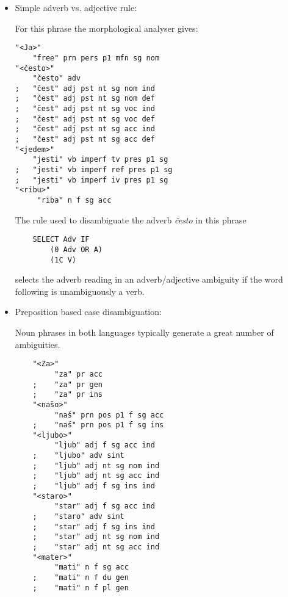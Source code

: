 \begin{itemize}

\item Simple adverb vs. adjective rule:


For this phrase the morphological analyser gives:

{\small
\begin{Verbatim}
"<Ja>"
    "free" prn pers p1 mfn sg nom 
"<često>"
    "često" adv
;   "čest" adj pst nt sg nom ind
;   "čest" adj pst nt sg nom def
;   "čest" adj pst nt sg voc ind
;   "čest" adj pst nt sg voc def
;   "čest" adj pst nt sg acc ind
;   "čest" adj pst nt sg acc def
"<jedem>"
    "jesti" vb imperf tv pres p1 sg
;   "jesti" vb imperf ref pres p1 sg
;   "jesti" vb imperf iv pres p1 sg
"<ribu>"
     "riba" n f sg acc 
\end{Verbatim}
}

The rule used to disambiguate the adverb \emph{često} in this phrase

{\small\begin{verbatim}
    SELECT Adv IF 
        (0 Adv OR A) 
        (1C V)
\end{verbatim}
}

selects the adverb reading in an adverb/adjective ambiguity if the
word following is unambiguously a verb.

\item Preposition based case disambiguation:


Noun phrases in both languages typically generate a great number of
ambiguities.

{\small
\begin{Verbatim}
    "<Za>"
         "za" pr acc 
    ;    "za" pr gen
    ;    "za" pr ins
    "<našo>"
         "naš" prn pos p1 f sg acc 
    ;    "naš" prn pos p1 f sg ins
    "<ljubo>"
         "ljub" adj f sg acc ind 
    ;    "ljubo" adv sint
    ;    "ljub" adj nt sg nom ind
    ;    "ljub" adj nt sg acc ind
    ;    "ljub" adj f sg ins ind
    "<staro>"
         "star" adj f sg acc ind 
    ;    "staro" adv sint
    ;    "star" adj f sg ins ind
    ;    "star" adj nt sg nom ind
    ;    "star" adj nt sg acc ind
    "<mater>"
         "mati" n f sg acc 
    ;    "mati" n f du gen
    ;    "mati" n f pl gen
\end{Verbatim} 
}


\end{itemize}
